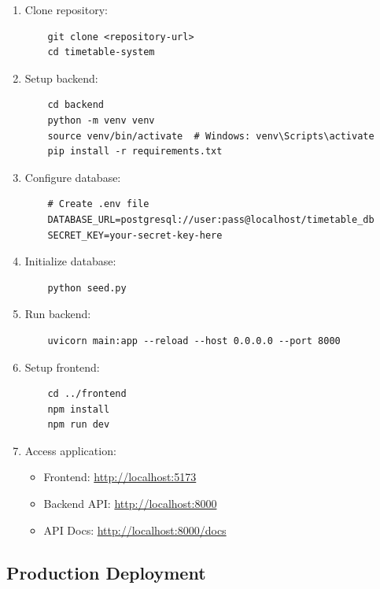 \documentclass[12pt,a4paper]{article}
\begin{document}
\begin{enumerate}
    \item Clone repository:
    \begin{verbatim}
    git clone <repository-url>
    cd timetable-system
    \end{verbatim}
    
    \item Setup backend:
    \begin{verbatim}
    cd backend
    python -m venv venv
    source venv/bin/activate  # Windows: venv\Scripts\activate
    pip install -r requirements.txt
    \end{verbatim}
    
    \item Configure database:
    \begin{verbatim}
    # Create .env file
    DATABASE_URL=postgresql://user:pass@localhost/timetable_db
    SECRET_KEY=your-secret-key-here
    \end{verbatim}
    
    \item Initialize database:
    \begin{verbatim}
    python seed.py
    \end{verbatim}
    
    \item Run backend:
    \begin{verbatim}
    uvicorn main:app --reload --host 0.0.0.0 --port 8000
    \end{verbatim}
    
    \item Setup frontend:
    \begin{verbatim}
    cd ../frontend
    npm install
    npm run dev
    \end{verbatim}
    
    \item Access application:
    \begin{itemize}
        \item Frontend: \url{http://localhost:5173}
        \item Backend API: \url{http://localhost:8000}
        \item API Docs: \url{http://localhost:8000/docs}
    \end{itemize}
\end{enumerate}


\subsection{Production Deployment}
\end{document}

